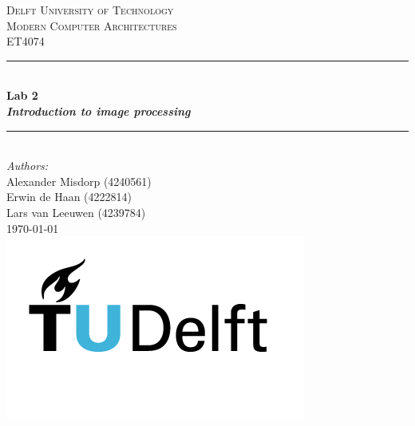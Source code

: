 \documentclass{article}
\begin{document}
\begin{titlepage}

\newcommand{\HRule}{\rule{\linewidth}{0.5mm}}
\newcommand{\tab}[1]{\hspace{.2\textwidth}\rlap{#1}}
\center

\textsc{\LARGE Delft University of Technology}\\[1.5cm]
\textsc{\large Modern Computer Architectures}\\[0.5cm] 
\textsc{\large ET4074}\\[0.5cm]

\HRule \\[0.5cm]
{ \huge \bfseries Lab 2}\\[0.4cm]
{ \Large \itshape \bfseries Introduction to image
processing} \\ [0.3cm]
\HRule \\[1.5cm]

\Large \emph{Authors:}\\
Alexander Misdorp (4240561) \\
Erwin de Haan (4222814)\\
Lars van Leeuwen (4239784)\\[2.8cm]

{\large \today}\\[2cm]

\includegraphics[scale=0.27]{images/TU_Delft_logo_RGB.png}\\%

\vfill %

\end{titlepage}








%
%
\end{document}
